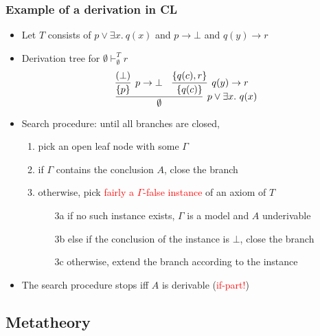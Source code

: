 \documentclass[handout,11pt]{beamer}
\newcommand{\red}[1]{\textcolor{red}{#1}}
\newcommand{\set}[1]{\{#1\}}
\begin{document}
\begin{frame}\label{proofsearch}
\frametitle{Example of a derivation in CL}
 \begin{itemize}[<+->]   %
    \item Let $T$ consists of $p\lor \exists x.~q(x)$ 
    and $p\to\bot$ and $q(y)\to r$
    \item Derivation tree for $\emptyset\vdash_{\emptyset}^T r$
    \[
\infer[p\vee \exists x.~q(x)]{\emptyset}
{
\infer[p\to\bot]{\set{p}}{(\bot)} & \infer[q(y)\to r]{\set{q(c)}}{\set{q(c),r}}
}
\]
    \item Search procedure: until all branches are closed,
    \begin{enumerate}
    \item pick an open leaf node with some $\Gamma$
    \item if $\Gamma$ contains the conclusion $A$, close the branch
    \item otherwise, pick \red{fairly a $\Gamma$-false 
    instance} of an axiom of $T$    
    \begin{itemize}
    \item[3a] if no such instance exists, $\Gamma$ is a model and $A$ underivable
    \item[3b] else if the conclusion of the instance is $\bot$, close the branch
    \item[3c] otherwise, extend the branch according to the instance 
    \end{itemize}
    \end{enumerate}
    \item The search procedure stops iff $A$ is derivable (\red{if-part!})
 \end{itemize}
\end{frame}

\subsection{Metatheory}
\end{document}
